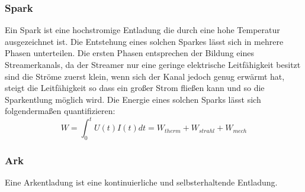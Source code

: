 \subsubsection{Spark}
Ein Spark ist eine hochstromige Entladung die durch eine hohe Temperatur ausgezeichnet ist. Die Entstehung eines solchen Sparkes lässt sich in mehrere Phasen unterteilen. Die ersten Phasen entsprechen der Bildung eines Streamerkanals, da der Streamer nur eine geringe elektrische Leitfähigkeit besitzt sind die Ströme zuerst klein, wenn sich der Kanal jedoch genug erwärmt hat, steigt die Leitfähigkeit so dass ein großer Strom fließen kann und so die Sparkentlung möglich wird.
Die Energie eines solchen Sparks lässt sich folgendermaßen quantifizieren:
\begin{equation}
    W = \int_{0}^{t} U(t)I(t)dt = W_{therm} + W_{strahl} + W_{mech}
\end{equation}
\subsubsection{Ark}
Eine Arkentladung ist eine kontinuierliche und selbsterhaltende Entladung.
% 

